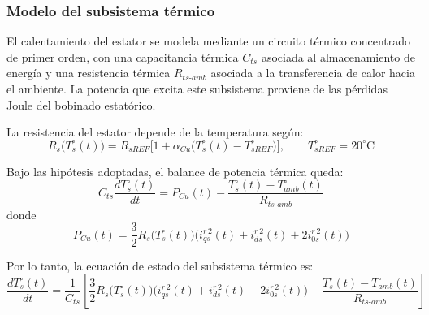 \documentclass[12pt, a4paper,journal, onecolumn, compsoc]{IEEEtran}
\begin{document}
    \subsubsection{Modelo del subsistema térmico}
    El calentamiento del estator se modela mediante un circuito térmico concentrado de primer orden, con una capacitancia térmica \(C_{ts}\) asociada al almacenamiento de energía y una resistencia térmica \(R_{ts\text{-}amb}\) asociada a la transferencia de calor hacia el ambiente. La potencia que excita este subsistema proviene de las pérdidas Joule del bobinado estatórico.

    La resistencia del estator depende de la temperatura según:
    \begin{equation}
        R_s\big(T_s^\circ(t)\big)=R_{sREF}\Big[1+\alpha_{Cu}\big(T_s^\circ(t)-T_{sREF}^\circ\big)\Big], \qquad T_{sREF}^\circ=20^\circ\text{C}
    \end{equation}

    Bajo las hipótesis adoptadas, el balance de potencia térmica queda:
    \begin{equation}
        C_{ts}\frac{dT_s^\circ(t)}{dt}=P_{Cu}(t)-\frac{T_s^\circ(t)-T_{amb}^\circ(t)}{R_{ts\text{-}amb}}
    \end{equation}
    donde
    \begin{equation}
        P_{Cu}(t)=\frac{3}{2}R_s\big(T_s^\circ(t)\big)\Big(i_{qs}^{r\,2}(t)+i_{ds}^{r\,2}(t)+2i_{0s}^{r\,2}(t)\Big)
    \end{equation}

    Por lo tanto, la ecuación de estado del subsistema térmico es:
    \begin{equation}
        \frac{dT_s^\circ(t)}{dt}=\frac{1}{C_{ts}}\left[\frac{3}{2}R_s\big(T_s^\circ(t)\big)\Big(i_{qs}^{r\,2}(t)+i_{ds}^{r\,2}(t)+2i_{0s}^{r\,2}(t)\Big)-\frac{T_s^\circ(t)-T_{amb}^\circ(t)}{R_{ts\text{-}amb}}\right]
    \end{equation}
\end{document}
